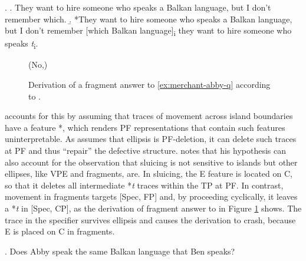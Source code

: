 \ex. \a. They want to hire someone who speaks a Balkan language, but I don't remember which. \hfill\citep[705]{merchant2004}
 \b. *They want to hire someone who speaks a Balkan language, but I don't remember [which Balkan language]\textsubscript{i} they want to hire someone who speaks \textit{t}\textsubscript{i}.
 
 \begin{figure}
(No,) 

\caption{Derivation of a fragment answer to \ref{ex:merchant-abby-q} according to \citet[708]{merchant2004}.\label{fig:merchant-abby-a}}
\end{figure}
%
\citet[706]{merchant2004} accounts for this by assuming that traces of movement across island boundaries have a feature *, which renders PF representations that contain such features uninterpretable. As \citeauthor{merchant2004} assumes that ellipsis is PF-deletion, it can delete such traces at PF and thus ``repair'' the defective structure. \citeauthor{merchant2004} notes that his hypothesis can also account for the observation that sluicing is not sensitive to islands but other ellipses, like VPE and fragments, are. In sluicing, the E feature is located on C, so that it deletes all intermediate *\textit{t} traces within the TP at PF. In contrast, movement in fragments targets [Spec, FP] and, by proceeding cyclically, it leaves a *\textit{t} in [Spec, CP], as the derivation of fragment answer to \Next in Figure \ref{fig:merchant-abby-a} shows. The trace in the specifier survives ellipsis and causes the derivation to crash, because E is placed on C in fragments. 

\ex. Does Abby speak the same Balkan language that Ben speaks?\label{ex:merchant-abby-q}

